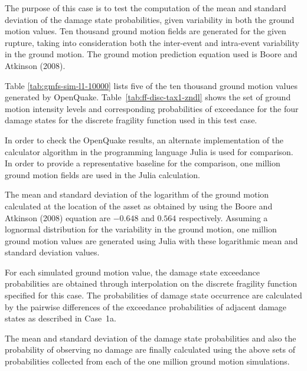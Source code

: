 The purpose of this case is to test the computation of the mean and standard deviation of the damage state probabilities, given variability in both the ground motion values. Ten thousand ground motion fields are generated for the given rupture, taking into consideration both the inter-event and intra-event variability in the ground motion. The ground motion prediction equation used is Boore and Atkinson (2008).

Table \ref{tab:gmfs-sim-l1-10000} lists five of the ten thousand ground motion values generated by OpenQuake. Table~\ref{tab:ff-disc-tax1-zndl} shows the set of ground motion intensity levels and corresponding probabilities of exceedance for the four damage states for the discrete fragility function used in this test case.

In order to check the OpenQuake results, an alternate implementation of the calculator algorithm in the programming language Julia is used for comparison. In order to provide a representative baseline for the comparison, one million ground motion fields are used in the Julia calculation.

The mean and standard deviation of the logarithm of the ground motion calculated at the location of the asset as obtained by using the Boore and Atkinson (2008) equation are $-0.648$ and $0.564$ respectively. Assuming a lognormal distribution for the variability in the ground motion, one million ground motion values are generated using Julia with these logarithmic mean and standard deviation values.

For each simulated ground motion value, the damage state exceedance probabilities are obtained through interpolation on the discrete fragility function specified for this case. The probabilities of damage state occurrence are calculated by the pairwise differences of the exceedance probabilities of adjacent damage states as described in Case~1a.

The mean and standard deviation of the damage state probabilities and also the probability of observing no damage are finally calculated using the above sets of probabilities collected from each of the one million ground motion simulations.